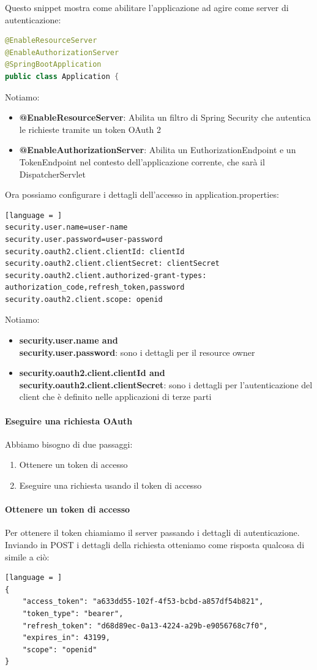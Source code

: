 \documentclass[11pt,a4paper]{book}
\begin{document}
Questo snippet mostra come abilitare l'applicazione ad agire come server di autenticazione:
\begin{lstlisting}[language = Java]
@EnableResourceServer
@EnableAuthorizationServer
@SpringBootApplication
public class Application {
\end{lstlisting}
Notiamo:
\begin{itemize}
	\item \textbf{@EnableResourceServer}: Abilita un filtro di Spring Security che autentica le richieste tramite un token OAuth 2
	\item \textbf{@EnableAuthorizationServer}: Abilita un EuthorizationEndpoint e un TokenEndpoint nel contesto dell'applicazione corrente, che sarà il DispatcherServlet
\end{itemize}

Ora possiamo configurare i dettagli dell'accesso in application.properties:
\begin{lstlisting}[language = ]
security.user.name=user-name
security.user.password=user-password
security.oauth2.client.clientId: clientId
security.oauth2.client.clientSecret: clientSecret
security.oauth2.client.authorized-grant-types:
authorization_code,refresh_token,password
security.oauth2.client.scope: openid
\end{lstlisting}

Notiamo:
\begin{itemize}
	\item \textbf{security.user.name and\\
		security.user.password}: sono i dettagli per il resource owner
	\item \textbf{security.oauth2.client.clientId and \\
		security.oauth2.client.clientSecret}: sono i dettagli per l'autenticazione del client che è definito nelle applicazioni di terze parti
\end{itemize}

\paragraph{Eseguire una richiesta OAuth}
Abbiamo bisogno di due passaggi:
\begin{enumerate}
	\item Ottenere un token di accesso
	\item Eseguire una richiesta usando il token di accesso
\end{enumerate}

\paragraph{Ottenere un token di accesso}
Per ottenere il token chiamiamo il server passando i dettagli di autenticazione. Inviando in POST i dettagli della richiesta otteniamo come risposta qualcosa di simile a ciò:
\begin{lstlisting}[language = ]
{
	"access_token": "a633dd55-102f-4f53-bcbd-a857df54b821",
	"token_type": "bearer",
	"refresh_token": "d68d89ec-0a13-4224-a29b-e9056768c7f0",
	"expires_in": 43199,
	"scope": "openid"
}
\end{lstlisting}
\end{document}

